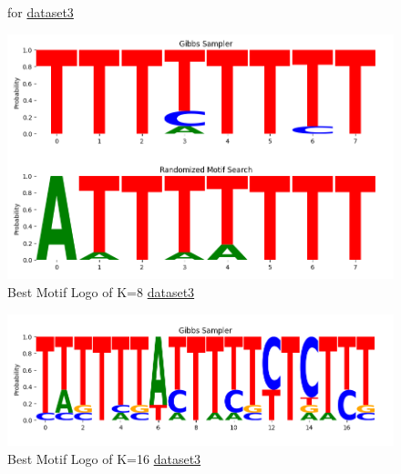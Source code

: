 \documentclass[11pt]{article}
\begin{document}
\begin{figure}[htbp]
\begin{minipage}[t]{0.5\columnwidth}
                    \caption{for \href{https://github.com/Superb-Man/Bio-Info/blob/master/data/yst08r.txt}{dataset3}}
                    \label{fig:Fig-3}
                \end{minipage}
                \begin{minipage}[t]{0.5\columnwidth}
                    \centering
                    \includegraphics[width=0.5\columnwidth]{images/3-8.png} 
                    \caption{Best Motif Logo of K=8 \href{https://github.com/Superb-Man/Bio-Info/blob/master/data/yst08r.txt}{dataset3}}
                    \label{fig:Fig-4}
                \end{minipage}
            \end{figure}
            \begin{figure}[hbt!]
                \centering
                \includegraphics[width=0.5\columnwidth]{images/3-16.png} 
                \caption{Best Motif Logo of K=16 \href{https://github.com/Superb-Man/Bio-Info/blob/master/data/yst08r.txt}{dataset3}}
                \label{fig:Fig-5}
            \end{figure}
        \newpage
\end{document}
